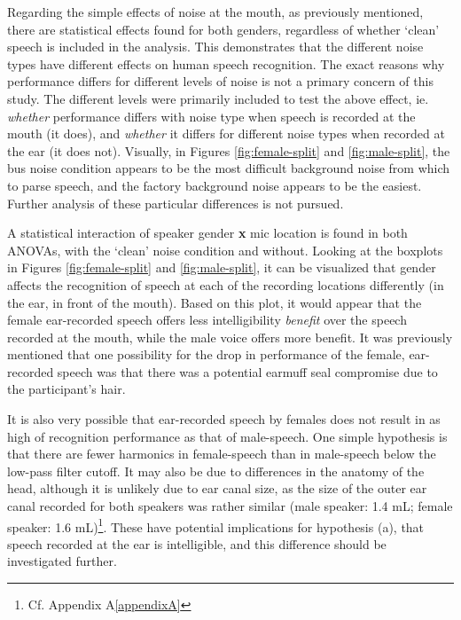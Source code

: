 Regarding the simple effects of noise at the mouth, as previously mentioned, there are statistical effects found for both genders, regardless of whether `clean' speech is included in the analysis.  This demonstrates that the different noise types have different effects on human speech recognition.  The exact reasons why performance differs for different levels of noise is not a primary concern of this study.  The different levels were primarily included to test the above effect, ie. \textit{whether} performance differs with noise type when speech is recorded at the mouth (it does), and \textit{whether} it differs for different noise types when recorded at the ear (it does not).   Visually, in Figures \ref{fig:female-split} and \ref{fig:male-split}, the bus noise condition appears to be the most difficult background noise from which to parse speech, and the factory background noise appears to be the easiest.  Further analysis of these particular differences is not pursued.



A statistical interaction of speaker gender \textbf{x} mic location is found in both ANOVAs, with the `clean' noise condition and without.  
Looking at the boxplots in Figures \ref{fig:female-split} and \ref{fig:male-split}, it can be visualized that gender affects the recognition of speech at each of the recording locations differently (in the ear, in front of the mouth).  Based on this plot, it would appear that the female ear-recorded speech offers less intelligibility \textit{benefit} over the speech recorded at the mouth, while the male voice offers more benefit. It was previously mentioned that one possibility for the drop in performance of the female, ear-recorded speech was that there was a potential earmuff seal compromise due to the participant's hair.  

It is also very possible that ear-recorded speech by females does not result in as high of recognition performance as that of male-speech.  One simple hypothesis is that there are fewer harmonics in female-speech than in male-speech below the low-pass filter cutoff.  It may also be due to differences in the anatomy of the head, although it is unlikely due to ear canal size, as the size of the outer ear canal recorded for both speakers was rather similar (male speaker: 1.4 mL; female speaker: 1.6 mL)\footnote{Cf. Appendix A\ref{appendixA}}.  These have potential implications for hypothesis (a), that speech recorded at the ear is intelligible, and this difference should be investigated further.
%
%

